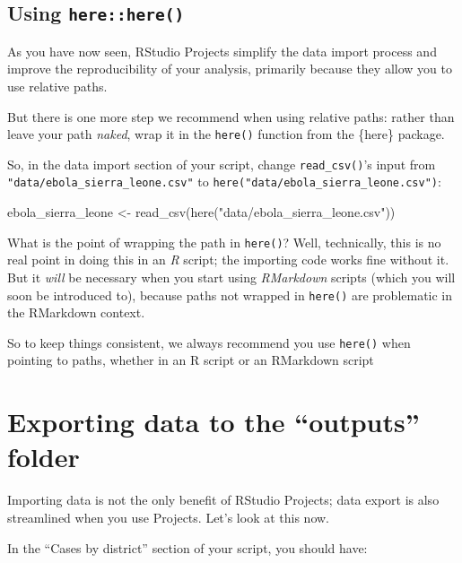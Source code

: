 \documentclass[
  letterpaper,
  DIV=11,
  numbers=noendperiod]{scrreprt}
\newenvironment{Shaded}{\begin{snugshade}}{\end{snugshade}}
\newcommand{\FunctionTok}[1]{\textcolor[rgb]{0.28,0.35,0.67}{#1}}
\newcommand{\NormalTok}[1]{\textcolor[rgb]{0.00,0.23,0.31}{#1}}
\newcommand{\OtherTok}[1]{\textcolor[rgb]{0.00,0.23,0.31}{#1}}
\newcommand{\StringTok}[1]{\textcolor[rgb]{0.13,0.47,0.30}{#1}}
\begin{document}
\hypertarget{using-herehere}{%
\subsection{\texorpdfstring{Using
\texttt{here::here()}}{Using here::here()}}\label{using-herehere}}

As you have now seen, RStudio Projects simplify the data import process
and improve the reproducibility of your analysis, primarily because they
allow you to use relative paths.

But there is one more step we recommend when using relative paths:
rather than leave your path \emph{naked}, wrap it in the \texttt{here()}
function from the \{here\} package.

So, in the data import section of your script, change
\texttt{read\_csv()}'s input from
\texttt{"data/ebola\_sierra\_leone.csv"} to
\texttt{here("data/ebola\_sierra\_leone.csv")}:

\begin{Shaded}
\begin{Highlighting}[]
\NormalTok{ebola\_sierra\_leone }\OtherTok{\textless{}{-}} \FunctionTok{read\_csv}\NormalTok{(}\FunctionTok{here}\NormalTok{(}\StringTok{"data/ebola\_sierra\_leone.csv"}\NormalTok{))}
\end{Highlighting}
\end{Shaded}

What is the point of wrapping the path in \texttt{here()}? Well,
technically, this is no real point in doing this in an \emph{R} script;
the importing code works fine without it. But it \emph{will} be
necessary when you start using \emph{RMarkdown} scripts (which you will
soon be introduced to), because paths not wrapped in \texttt{here()} are
problematic in the RMarkdown context.

So to keep things consistent, we always recommend you use
\texttt{here()} when pointing to paths, whether in an R script or an
RMarkdown script

\hypertarget{exporting-data-to-the-outputs-folder}{%
\section{Exporting data to the ``outputs''
folder}\label{exporting-data-to-the-outputs-folder}}

Importing data is not the only benefit of RStudio Projects; data export
is also streamlined when you use Projects. Let's look at this now.

In the ``Cases by district'' section of your script, you should have:
\end{document}
